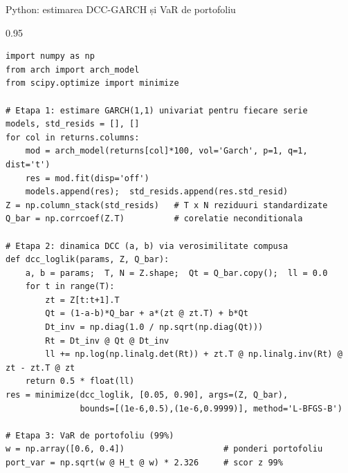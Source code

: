 \documentclass[9pt, aspectratio=169, t]{beamer}
\begin{document}

\begin{frame}[fragile]{Python: estimarea DCC-GARCH și VaR de portofoliu}
    \begin{cminipage}{0.95\textwidth}
    \vspace{-2mm}
    {\tiny
\begin{verbatim}
import numpy as np
from arch import arch_model
from scipy.optimize import minimize

# Etapa 1: estimare GARCH(1,1) univariat pentru fiecare serie
models, std_resids = [], []
for col in returns.columns:
    mod = arch_model(returns[col]*100, vol='Garch', p=1, q=1, dist='t')
    res = mod.fit(disp='off')
    models.append(res);  std_resids.append(res.std_resid)
Z = np.column_stack(std_resids)   # T x N reziduuri standardizate
Q_bar = np.corrcoef(Z.T)          # corelatie neconditionala

# Etapa 2: dinamica DCC (a, b) via verosimilitate compusa
def dcc_loglik(params, Z, Q_bar):
    a, b = params;  T, N = Z.shape;  Qt = Q_bar.copy();  ll = 0.0
    for t in range(T):
        zt = Z[t:t+1].T
        Qt = (1-a-b)*Q_bar + a*(zt @ zt.T) + b*Qt
        Dt_inv = np.diag(1.0 / np.sqrt(np.diag(Qt)))
        Rt = Dt_inv @ Qt @ Dt_inv
        ll += np.log(np.linalg.det(Rt)) + zt.T @ np.linalg.inv(Rt) @ zt - zt.T @ zt
    return 0.5 * float(ll)
res = minimize(dcc_loglik, [0.05, 0.90], args=(Z, Q_bar),
               bounds=[(1e-6,0.5),(1e-6,0.9999)], method='L-BFGS-B')

# Etapa 3: VaR de portofoliu (99%)
w = np.array([0.6, 0.4])                    # ponderi portofoliu
port_var = np.sqrt(w @ H_t @ w) * 2.326     # scor z 99%
\end{verbatim}
    }
    \end{cminipage}
    \hfill{}
\end{frame}

\end{document}
